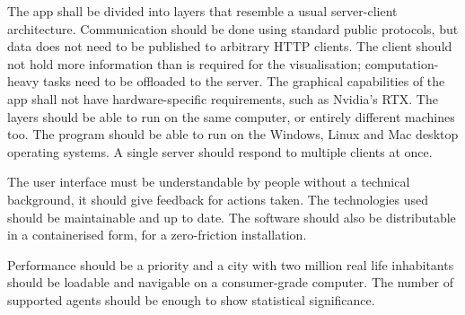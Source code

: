 The app shall be divided into layers that resemble a usual server-client architecture. Communication should be done using standard public protocols, but data does not need to be published to arbitrary HTTP clients. The client should not hold more information than is required for the visualisation; computation-heavy tasks need to be offloaded to the server. The graphical capabilities of the app shall not have hardware-specific requirements, such as Nvidia's RTX. The layers should be able to run on the same computer, or entirely different machines too. The program should be able to run on the Windows, Linux and Mac desktop operating systems. A single server should respond to multiple clients at once.

The user interface must be understandable by people without a technical background, it should give feedback for actions taken. The technologies used should be maintainable and up to date. The software should also be distributable in a containerised form, for a zero-friction installation.

Performance should be a priority and a city with two million real life inhabitants should be loadable and navigable on a consumer-grade computer. The number of supported agents should be enough to show statistical significance.